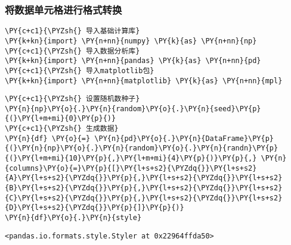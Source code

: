     \hypertarget{ux5c06ux6570ux636eux5355ux5143ux683cux8fdbux884cux683cux5f0fux8f6cux6362}{%
\subsubsection{将数据单元格进行格式转换}\label{ux5c06ux6570ux636eux5355ux5143ux683cux8fdbux884cux683cux5f0fux8f6cux6362}}

    \begin{tcolorbox}[breakable, size=fbox, boxrule=1pt, pad at break*=1mm,colback=cellbackground, colframe=cellborder]
\begin{Verbatim}[commandchars=\\\{\}]
\PY{c+c1}{\PYZsh{} 导入基础计算库}
\PY{k+kn}{import} \PY{n+nn}{numpy} \PY{k}{as} \PY{n+nn}{np}
\PY{c+c1}{\PYZsh{} 导入数据分析库}
\PY{k+kn}{import} \PY{n+nn}{pandas} \PY{k}{as} \PY{n+nn}{pd}
\PY{c+c1}{\PYZsh{} 导入matplotlib包}
\PY{k+kn}{import} \PY{n+nn}{matplotlib} \PY{k}{as} \PY{n+nn}{mpl}
\end{Verbatim}
\end{tcolorbox}

    \begin{tcolorbox}[breakable, size=fbox, boxrule=1pt, pad at break*=1mm,colback=cellbackground, colframe=cellborder]
\begin{Verbatim}[commandchars=\\\{\}]
\PY{c+c1}{\PYZsh{} 设置随机数种子}
\PY{n}{np}\PY{o}{.}\PY{n}{random}\PY{o}{.}\PY{n}{seed}\PY{p}{(}\PY{l+m+mi}{0}\PY{p}{)}
\PY{c+c1}{\PYZsh{} 生成数据}
\PY{n}{df} \PY{o}{=} \PY{n}{pd}\PY{o}{.}\PY{n}{DataFrame}\PY{p}{(}\PY{n}{np}\PY{o}{.}\PY{n}{random}\PY{o}{.}\PY{n}{randn}\PY{p}{(}\PY{l+m+mi}{10}\PY{p}{,}\PY{l+m+mi}{4}\PY{p}{)}\PY{p}{,} \PY{n}{columns}\PY{o}{=}\PY{p}{[}\PY{l+s+s2}{\PYZdq{}}\PY{l+s+s2}{A}\PY{l+s+s2}{\PYZdq{}}\PY{p}{,}\PY{l+s+s2}{\PYZdq{}}\PY{l+s+s2}{B}\PY{l+s+s2}{\PYZdq{}}\PY{p}{,}\PY{l+s+s2}{\PYZdq{}}\PY{l+s+s2}{C}\PY{l+s+s2}{\PYZdq{}}\PY{p}{,}\PY{l+s+s2}{\PYZdq{}}\PY{l+s+s2}{D}\PY{l+s+s2}{\PYZdq{}}\PY{p}{]}\PY{p}{)}
\PY{n}{df}\PY{o}{.}\PY{n}{style}
\end{Verbatim}
\end{tcolorbox}

            \begin{tcolorbox}[breakable, size=fbox, boxrule=.5pt, pad at break*=1mm, opacityfill=0]
\begin{Verbatim}[commandchars=\\\{\}]
<pandas.io.formats.style.Styler at 0x22964ffda50>
\end{Verbatim}
\end{tcolorbox}
        
